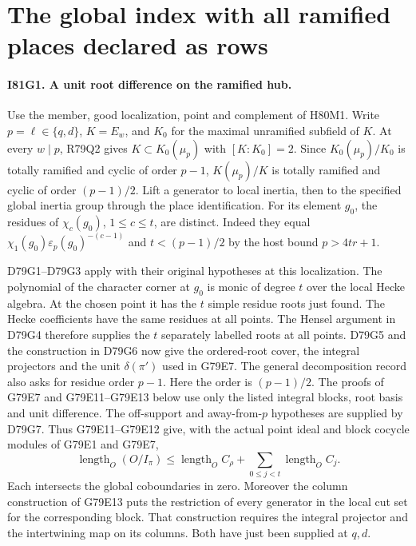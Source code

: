 \section{The global index with all ramified places declared as rows}

\paragraph{I81G1. A unit root difference on the ramified hub.}
Use the member, good localization, point and complement of H80M1.
Write $p=\ell\in\{q,d\}$, $K=E_w$, and $K_0$ for the maximal
unramified subfield of $K$. At every $w\mid p$, R79Q2 gives
$K\subset K_0(\mu_p)$ with $[K:K_0]=2$. Since
$K_0(\mu_p)/K_0$ is totally ramified and cyclic of order $p-1$,
$K(\mu_p)/K$ is totally ramified and cyclic of order $(p-1)/2$.
Lift a generator to local inertia, then to the specified global
inertia group through the place identification. For its element
$g_0$, the residues of $\chi_c(g_0)$, $1\le c\le t$, are distinct.
Indeed they equal $\chi_1(g_0)\varepsilon_p(g_0)^{-(c-1)}$
and $t<(p-1)/2$ by the host bound $p>4tr+1$.

D79G1--D79G3 apply with their original hypotheses at this localization.
The polynomial of the character corner at $g_0$ is monic of degree
$t$ over the local Hecke algebra. At the chosen point it has the
$t$ simple residue roots just found. The Hecke coefficients have
the same residues at all points. The Hensel argument in D79G4
therefore supplies the $t$ separately labelled roots at all points.
D79G5 and the construction in D79G6 now give the ordered-root cover,
the integral projectors and the unit $\delta(\pi')$ used in G79E7. The general decomposition
record also asks for residue order $p-1$. Here the order is
$(p-1)/2$. The proofs of G79E7 and G79E11--G79E13 below use
only the listed integral blocks, root basis and unit difference.
The off-support and away-from-$p$ hypotheses are supplied by D79G7.
Thus G79E11--G79E12 give, with the actual point ideal and block
cocycle modules of G79E1 and G79E7,
\[
  \operatorname{length}_O(O/I_\pi)\le
  \operatorname{length}_O C_\rho+
  \sum_{0\le j<t}\operatorname{length}_O C_j .
\]
Each intersects the global coboundaries in zero. Moreover the column
construction of G79E13 puts the restriction of every generator in
the local cut set for the corresponding block. That construction
requires the integral projector and the intertwining map on its
columns. Both have just been supplied at $q,d$.

